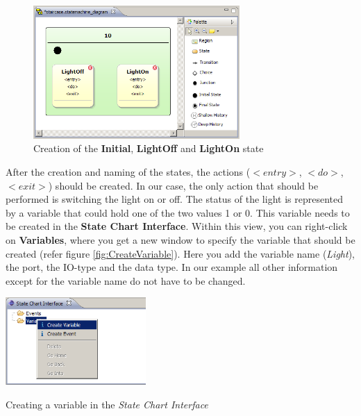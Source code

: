 \begin{figure}[ht] \center
\includegraphics[width=0.7\textwidth]{./Pictures/StateCreation_1}
\caption{\label{fig:StateCreation}Creation of the \textbf{Initial}, 
\textbf{LightOff} and \textbf{LightOn} state}
\end{figure}

After the creation and naming of the states, the actions ($<entry>$, $<do>$,
$<exit>$) should be created. In our case, the only action that should be
performed is switching the light on or off. The status of the light is
represented by a variable that could hold one of the two values 1 or 0. This
variable needs to be created in the \textbf{State Chart Interface}. Within this
view, you can right-click on \textbf{Variables}, where you get a new window to
specify the variable that should be created (refer figure
\ref{fig:CreateVariable}). Here you add the variable name (\textit{Light}), the
port, the IO-type and the data type. In our example all other information except
for the variable name do not have to be changed.

\begin{floatingfigure}[r]{0.4\textwidth}
\includegraphics[width=0.4\textwidth]{./Pictures/CreateVariable}
\caption{\label{fig:CreateVariable}Creating a variable in the \textit{State Chart Interface}}
\end{floatingfigure}


